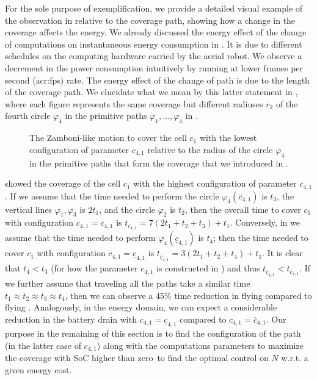 For the sole purpose of exemplification, we provide a detailed visual example of the observation in  relative to the coverage path, showing how a change in the coverage affects the energy. We already discussed the energy effect of the change of computations on instantaneous energy consumption in . It is due to different schedules on the computing hardware carried by the aerial robot. We observe a decrement in the power consumption intuitively by running at lower frames per second (\Gls{acr:fps}) rate. The energy effect of the change of path is due to the length of the coverage path. We elucidate what we mean by this latter statement in , where each figure represents the same coverage but different radiuses $r_2$ of the fourth circle $\varphi_4$ in the primitive paths $\varphi_1,\dots,\varphi_4$ in . 
\begin{figure}[h]
  \centering
  \selectfont
  
  \caption[The Zamboni-like motion with the lowest parameter configuration.]{The Zamboni-like motion to cover the cell $c_1$ with the lowest configuration of parameter $c_{4,1}$ relative to the radius of the circle $\varphi_4$ in the primitive paths that form the coverage that we introduced in .}
  \label{fig:zambo2}
\end{figure}
 showed the coverage of the cell $c_1$ with the highest configuration of parameter $c_{4,1}$. If we assume that the time needed to perform the circle $\varphi_4(\overline{c}_{4,1})$ is $t_3$, the vertical lines $\varphi_1,\varphi_3$ is $2t_1$, and the circle $\varphi_2$ is $t_2$, then the overall time to cover $c_1$ with configuration ${c}_{4,1}=\overline{c}_{4,1}$ is $t_{\overline{c}_{4,1}}=7(2t_1+t_2+t_3)+t_1$. Conversely, in  we assume that the time needed to perform $\varphi_4(\underline{c}_{4,1})$ is $t_4$; then the time needed to cover $c_1$ with configuration ${c}_{4,1}=\underline{c}_{4,1}$ is $t_{\underline{c}_{4,1}}=3(2t_1+t_2+t_4)+t_1$. It is clear that $t_4<t_3$ (for how the parameter $c_{4,1}$ is constructed in ) and thus $t_{\underline{c}_{4,1}}<t_{\overline{c}_{4,1}}$. If we further assume that traveling all the paths take a similar time $t_1\approx t_2\approx t_3\approx t_4$, then we can observe a 45\% time reduction in flying  compared to flying . Analogously, in the energy domain, we can expect a considerable reduction in the battery drain with ${c}_{4,1}=\underline{c}_{4,1}$ compared to ${c}_{4,1}=\overline{c}_{4,1}$. Our purpose in the remaining of this section is to find the configuration of the path (in the latter case of $c_{4,1}$) along with the computations parameters to maximize the coverage with SoC higher than zero--to find the optimal control on $N$ w.r.t. a given energy cost.

